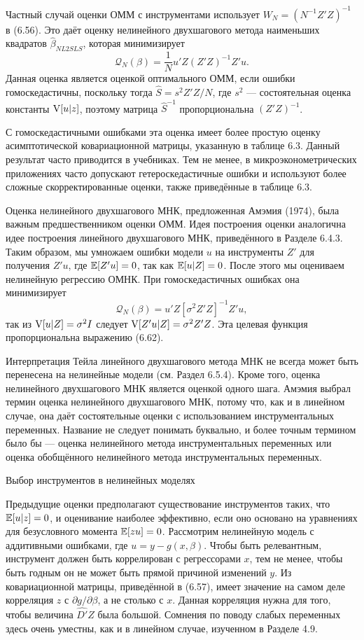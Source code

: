 Частный случай оценки ОММ с инструментами использует $W_N=(N^{-1}Z'Z)^{-1}$ в
(6.56). Это даёт оценку нелинейного двухшагового метода наименьших квадратов $\hat{\beta}_{NL2SLS}$, которая минимизирует
\begin{equation}
\mathcal{Q}_{N}(\beta)= \frac{1}{N} u'Z(Z'Z)^{-1}Z'u.
\end{equation}
Данная оценка является оценкой оптимального ОММ, если ошибки гомоскедастичны, поскольку тогда $\hat{S}=s^2 Z'Z /N$, где $s^2$ --- состоятельная оценка константы $\mathrm{V}[u|z]$, поэтому матрица ${\hat{S}}^{-1}$ пропорциональна $(Z'Z)^{-1}$.

С гомоскедастичными ошибками эта оценка имеет более простую оценку асимптотической ковариационной матрицы, указанную в таблице 6.3. Данный результат  часто приводится в учебниках. Тем не менее, в микроэконометрических приложениях часто допускают гетероскедастичные ошибки и используют более сложные скорректированные оценки, также приведённые в таблице 6.3.

Оценка нелинейного двухшагового МНК, предложенная Амэмия (1974), была важным предшественником оценки ОММ. Идея построения оценки аналогична идее построения линейного двухшагового МНК, приведённого в Разделе 6.4.3. Таким образом, мы умножаем ошибки модели $u$ на инструменты $Z'$ для получения $Z'u$, где $\mathbb{E}[Z'u]=0$, так как $\mathbb{E}[u|Z]=0$. После этого мы оцениваем нелинейную регрессию ОМНК. При гомоскедастичных ошибках она минимизирует 
\[
\mathcal{Q}_{N}(\beta)= u'Z[\sigma^2 Z'Z]^{-1}Z'u,
\]
так из $\mathrm{V}[u|Z]=\sigma^2 I$ следует $\mathrm{V}[Z'u|Z]=\sigma^2 Z'Z$. Эта целевая функция пропорциональна выражению (6.62).

Интерпретация Тейла линейного двухшагового метода МНК не всегда может быть перенесена на нелинейные модели (см. Раздел 6.5.4). Кроме того, оценка нелинейного двухшагового МНК является  оценкой одного шага. Амэмия выбрал термин оценка нелинейного двухшагового МНК, потому что, как и в линейном случае, она даёт состоятельные оценки с использованием инструментальных переменных. Название не следует понимать буквально, и более точным термином было бы --- оценка нелинейного метода инструментальных переменных или оценка обобщённого нелинейного метода инструментальных переменных.

\begin{center}
Выбор инструментов в нелинейных моделях
\end{center}

Предыдущие оценки предполагают существование инструментов таких, что $\mathbb{E}[u|z]=0$, и оценивание наиболее эффективно, если оно основано на уравнениях для  безусловного момента $\mathbb{E}[zu]=0$. Рассмотрим нелинейную модель с аддитивными ошибками, где $u=y-g(x,\beta)$. Чтобы быть релевантным, инструмент должен быть коррелирован с регрессорами $x$, тем не менее, чтобы быть годным он не может быть прямой причиной изменений $y$. Из ковариационной матрицы, приведённой в (6.57), имеет значение на самом деле корреляция $z$ с $\partial g/\partial \beta$, а не столько с $x$. Данная корреляция нужна для того, чтобы величина $\hat{D'}Z$ была большой. Сомнения по поводу слабых переменных здесь очень уместны, как и в линейном случае, изученном в Разделе 4.9.

